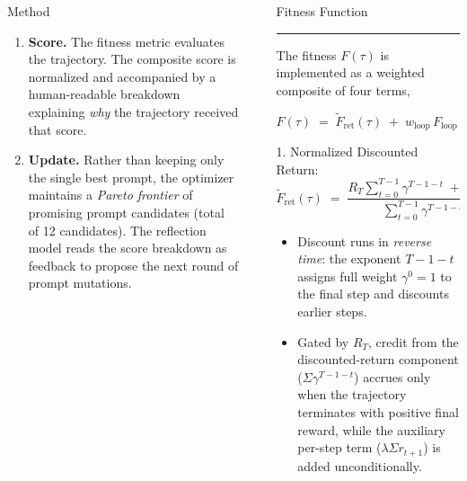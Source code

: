 \documentclass[final]{beamer}
\newcommand{\blockrule}{\vspace{-1.5em}\textcolor{harvardcrimson}{\rule{\linewidth}{1.2pt}}\vspace{-0.2em}}
\newlength{\sepwidth}
\newlength{\colwidth}
\newcommand{\separatorcolumn}{\begin{column}{\sepwidth}\end{column}}
\begin{document}
\begin{frame}[t]
\begin{columns}[t]
\begin{column}{\colwidth}
\begin{block}{Method}
\begin{enumerate}
    \item \textbf{Score.} The fitness metric evaluates the trajectory. The composite score is normalized and accompanied by a human-readable breakdown explaining \emph{why} the trajectory received that score.

    \item \textbf{Update.} Rather than keeping only the single best prompt, the optimizer maintains a \emph{Pareto frontier} of promising prompt candidates (total of 12 candidates). The reflection model reads the score breakdown as feedback to propose the next round of prompt mutations.
\end{enumerate}


  \end{block}

\end{column}

\separatorcolumn

\begin{column}{\colwidth}
    \begin{alertblock}{Fitness Function}
    \blockrule
    
    The fitness $F(\tau)$ is implemented as a weighted composite of four terms,
   
    \begin{equation}
    \label{eq:fitness_composite}
    F(\tau) \;=\; \tilde{F}_{\mathrm{ret}}(\tau) \;+\; w_{\mathrm{loop}}\, F_{\mathrm{loop}}(\tau) \;+\; w_{\mathrm{step}}\, F_{\mathrm{step}}(\tau) \;+\; w_{\mathrm{call}}\, F_{\mathrm{call}}(\tau).
    \end{equation}

1. Normalized Discounted Return:
    \begin{equation}
    \label{eq:fitness_return}
        \tilde{F}_{\mathrm{ret}}(\tau) \;=\; \frac{R_T\sum_{t=0}^{T-1}\gamma^{T-1-t} \;+\; \lambda\sum_{t=0}^{T-1} r_{t+1}}{\sum_{t=0}^{T-1}\gamma^{T-1-t} \;+\; \lambda\, T}, \qquad R_T \;=\; \mathds{1}[r_T > 0].
    \end{equation}

    \begin{itemize}
        \item Discount runs in \emph{reverse time}: the exponent $T{-}1{-}t$ assigns full weight $\gamma^{0}=1$ to the final step and discounts earlier steps.
        \item Gated by $R_T$, credit from the discounted-return component ($\Sigma\gamma^{T-1-t}$) accrues only when the trajectory terminates with positive final reward, while the auxiliary per-step term ($\lambda\Sigma r_{t+1}$) is added unconditionally.
    \end{itemize}


\end{alertblock}
\end{column}
\end{columns}
\end{frame}
\end{document}
